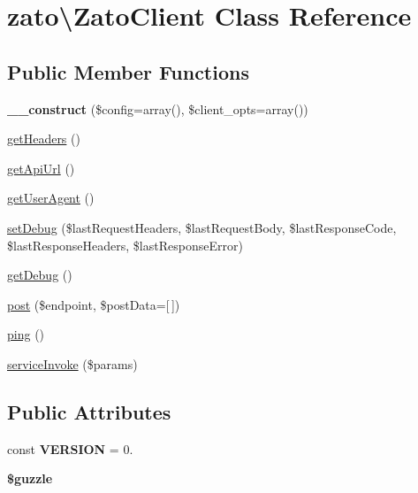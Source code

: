 \hypertarget{classzato_1_1_zato_client}{}\section{zato\textbackslash{}Zato\+Client Class Reference}
\label{classzato_1_1_zato_client}
\subsection*{Public Member Functions}
\begin{DoxyCompactItemize}
\item 
\hypertarget{classzato_1_1_zato_client_a1cc8c9c0397013ec5b4db5d314fd3f40}{}{\bfseries \+\_\+\+\_\+construct} (\$config=array(), \$client\+\_\+opts=array())\label{classzato_1_1_zato_client_a1cc8c9c0397013ec5b4db5d314fd3f40}

\item 
\hyperlink{classzato_1_1_zato_client_a53b3620c1606bef34ae5a63eef32f5f1}{get\+Headers} ()
\item 
\hyperlink{classzato_1_1_zato_client_ab1694e645df20117a171d3555493f11b}{get\+Api\+Url} ()
\item 
\hyperlink{classzato_1_1_zato_client_a24af3dc18befd6c3f4043b638d861e17}{get\+User\+Agent} ()
\item 
\hyperlink{classzato_1_1_zato_client_a09c7f937c1df19d0406582dc60f217ee}{set\+Debug} (\$last\+Request\+Headers, \$last\+Request\+Body, \$last\+Response\+Code, \$last\+Response\+Headers, \$last\+Response\+Error)
\item 
\hyperlink{classzato_1_1_zato_client_ae27d7f7a5200b9c2b8d179de8766e5ef}{get\+Debug} ()
\item 
\hyperlink{classzato_1_1_zato_client_a8f8b11e5ff12ce6c04b6f2c83438dd8e}{post} (\$endpoint, \$post\+Data=\mbox{[}$\,$\mbox{]})
\item 
\hyperlink{classzato_1_1_zato_client_a848f024e0c4617beec769064b0804c61}{ping} ()
\item 
\hyperlink{classzato_1_1_zato_client_aa4ee97642e8ca3b97d83a43d69f30c6c}{service\+Invoke} (\$params)
\end{DoxyCompactItemize}
\subsection*{Public Attributes}
\begin{DoxyCompactItemize}
\item 
\hypertarget{classzato_1_1_zato_client_a0ddb33d2c114aa69772dbff2c102b5e8}{}const {\bfseries V\+E\+R\+S\+I\+O\+N} = \textquotesingle{}0.\textquotesingle{}\label{classzato_1_1_zato_client_a0ddb33d2c114aa69772dbff2c102b5e8}

\item 
\hypertarget{classzato_1_1_zato_client_a0f902c04331ccd1e6e6472ff474ee40e}{}{\bfseries \$guzzle}\label{classzato_1_1_zato_client_a0f902c04331ccd1e6e6472ff474ee40e}

\end{DoxyCompactItemize}
